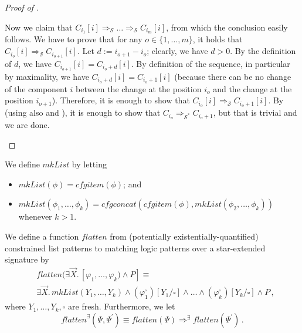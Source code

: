 \begin{proof}[Proof of ]
\begin{itemize}
          Now we claim that $C_{i_1}[i] \Rightarrow_{\mathcal{S}} \ldots \Rightarrow_{\mathcal{S}} C_{i_m}[i]$,
          from which the conclusion easily follows.
          We have to prove that for any $o \in \{ 1, \ldots, m \}$, it holds that
          $C_{i_o}[i] \Rightarrow_{\mathcal{S}} C_{i_{o+1}}[i]$.
          Let $d := i_{o+1} - i_{o}$; clearly, we have $d > 0$.
          By the definition of $d$, we have $C_{i_{o+1}}[i] = C_{i_{o} + d}[i]$.
          By definition of the sequence, in particular by maximality, we have $C_{i_{o} + d}[i] = C_{i_{o} + 1}[i]$
          (because there can be no change of the component $i$ between the change at the position $i_o$ and the change at the position $i_{o+1}$).
          Therefore, it is enough to show that
          $C_{i_o}[i] \Rightarrow_{\mathcal{S}} C_{i_{o}+1}[i]$.
          By  (using also  and ), it is enough to show that
          $C_{i_{o}} \Rightarrow_{\mathcal{S}^*} C_{i_{o}+1}$, but that is trivial and we are done.
\end{itemize}
\end{proof}

\begin{definition}\label{def:mkList}
We define $\mathit{mkList}$ by letting
\begin{itemize}
    \item $\mathit{mkList}(\phi) = \mathit{cfgitem}(\phi)$; and
    \item $\mathit{mkList}(\phi_1, \ldots, \phi_k) = \mathit{cfgconcat}(\mathit{cfgitem}(\phi), \mathit{mkList}(\phi_2, \ldots, \phi_k))$ whenever $k > 1$.
\end{itemize}
\end{definition}

\begin{definition}\label{def:flatten}
    We define a function $\mathit{flatten}$ from (potentially existentially-quantified) constrained list patterns
    to matching logic patterns over a star-extended signature by
    \begin{align*}
        & \mathit{flatten}(\exists \vec{X}.\, [\varphi_1, \ldots, \varphi_k) \land P] \equiv \\
        & \exists \vec{X}.\, \mathit{mkList}(Y_1, \ldots, Y_k)
        \land (\varphi_1^\square)[Y_1/\square] \land \ldots
        \land (\varphi_k^\square)[Y_k/\square] \land P \, ,
    \end{align*}
    where $Y_1,\ldots,Y_k,\square$ are fresh.
    Furthermore, we let
    \begin{equation*}
        \mathit{flatten}^\exists(\Psi,\Psi^\prime) \equiv \mathit{flatten}(\Psi) \Rightarrow^\exists \mathit{flatten}(\Psi^\prime) \, .
    \end{equation*}
\end{definition}


